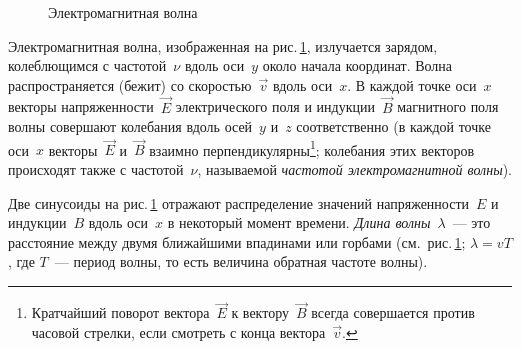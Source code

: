 \documentclass[main.tex]{subfiles}
\begin{document}
\begin{NoHyper}
\begin{figure}[H]
\caption{Электромагнитная волна}
\label{fig:p172}
\end{figure}

Электромагнитная волна, изображенная на рис.\,\ref{fig:p172}, излучается зарядом, колеблющимся с частотой~$\nu$ вдоль оси~$y$ около начала координат. Волна распространяется (бежит) со скоростью~$\vec v$ вдоль оси~$x$. В каждой точке оси~$x$ векторы напряженности~$\vec E$ электрического поля и индукции~$\vec B$ магнитного поля волны совершают колебания вдоль осей~$y$ и~$z$ соответственно (в каждой точке оси~$x$ векторы~$\vec E$ и~$\vec B$ взаимно перпендикулярны\footnote{Кратчайший поворот вектора~$\vec E$ к вектору~$\vec B$ всегда совершается против часовой стрелки, если смотреть с конца вектора~$\vec v$.}; колебания этих векторов происходят также с частотой~$\nu$, называемой \emph{частотой электромагнитной волны}). 

Две синусоиды на рис.\,\ref{fig:p172} отражают распределение значений напряженности~$E$ и индукции~$B$ вдоль оси~$x$ в некоторый момент времени. \emph{Длина волны}~$\lambda$~--- это расстояние между двумя ближайшими впадинами или горбами (см.~рис.\,\ref{fig:p172}; $\lambda=vT$, где $T$~--- период волны, то есть величина обратная частоте волны). 


\end{NoHyper}
\end{document}
